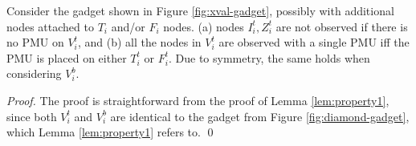 
\begin{lemma}\label{lem:property2}
Consider the gadget shown in Figure \ref{fig:xval-gadget}, possibly with additional nodes attached to $T_i$ and/or $F_i$ nodes. (a) nodes $I^t_i, Z^t_i$ are not observed if there is no PMU on $V_i^t$, and (b) all the nodes in $V_i^t$ are observed with a single PMU iff the PMU is placed on either $T_i^t$ or $F_i^t$. Due to symmetry, the same holds when considering $V_i^b$.
\end{lemma}
\begin{proof}
The proof is straightforward from the proof of Lemma \ref{lem:property1}, since both $V_i^t$ and $V_i^b$ are identical to the gadget from Figure \ref{fig:diamond-gadget},  which Lemma \ref{lem:property1} refers to. \qed
\end{proof}

